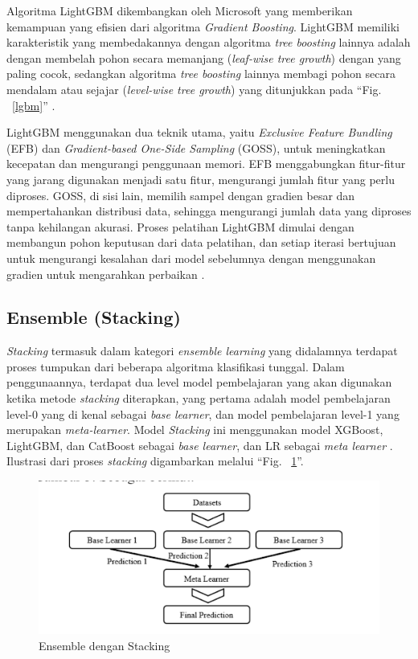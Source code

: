 \documentclass[conference]{IEEEtran}
\begin{document}
Algoritma LightGBM dikembangkan oleh Microsoft yang memberikan kemampuan yang efisien dari algoritma \textit{Gradient Boosting}. LightGBM memiliki 
karakteristik yang membedakannya dengan algoritma \textit{tree boosting} lainnya adalah dengan membelah pohon secara memanjang 
(\textit{leaf-wise tree growth}) dengan yang paling cocok, sedangkan algoritma \textit{tree boosting} lainnya membagi pohon secara mendalam atau sejajar (\textit{level-wise tree growth}) 
yang ditunjukkan pada ``Fig. ~\ref{lgbm}'' \cite{b30}.

LightGBM menggunakan dua teknik utama, yaitu \textit{Exclusive Feature Bundling} (EFB) dan \textit{Gradient-based One-Side Sampling} (GOSS), untuk meningkatkan kecepatan dan 
mengurangi penggunaan memori. EFB menggabungkan fitur-fitur yang jarang digunakan menjadi satu fitur, mengurangi jumlah fitur yang perlu diproses. GOSS, 
di sisi lain, memilih sampel dengan gradien besar dan mempertahankan distribusi data, sehingga mengurangi jumlah data yang diproses tanpa kehilangan akurasi. 
Proses pelatihan LightGBM dimulai dengan membangun pohon keputusan dari data pelatihan, dan setiap iterasi bertujuan untuk mengurangi kesalahan dari model sebelumnya 
dengan menggunakan gradien untuk mengarahkan perbaikan \cite{b31}.

\subsection{Ensemble (Stacking)}

\textit{Stacking} termasuk dalam kategori \textit{ensemble learning} yang didalamnya terdapat proses tumpukan dari beberapa algoritma klasifikasi tunggal. Dalam penggunaannya, terdapat dua level 
model pembelajaran yang akan digunakan ketika metode \textit{stacking} diterapkan, yang pertama adalah model pembelajaran level-0 yang di kenal sebagai \textit{base learner}, dan model 
pembelajaran level-1 yang merupakan \textit{meta-learner}. Model \textit{Stacking} ini menggunakan model XGBoost, LightGBM, dan CatBoost sebagai \textit{base learner}, dan LR sebagai \textit{meta learner} \cite{b32}. 
Ilustrasi dari proses \textit{stacking} digambarkan melalui ``Fig. ~\ref{stacking}''.

\begin{figure}[htbp]
    \centerline{\includegraphics[width=\linewidth]{stacking.png}}
    \caption{Ensemble dengan Stacking}
    \label{stacking}
\end{figure}
\end{document}
